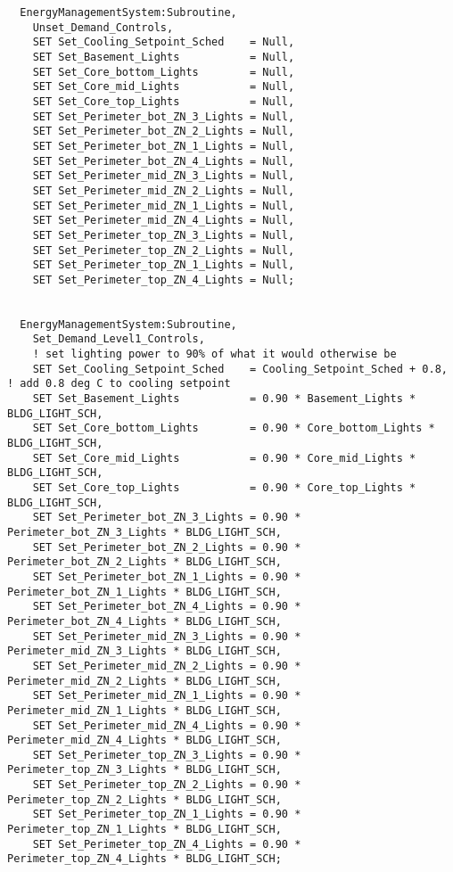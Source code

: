 \begin{lstlisting}
  EnergyManagementSystem:Subroutine,
    Unset_Demand_Controls,
    SET Set_Cooling_Setpoint_Sched    = Null,
    SET Set_Basement_Lights           = Null,
    SET Set_Core_bottom_Lights        = Null,
    SET Set_Core_mid_Lights           = Null,
    SET Set_Core_top_Lights           = Null,
    SET Set_Perimeter_bot_ZN_3_Lights = Null,
    SET Set_Perimeter_bot_ZN_2_Lights = Null,
    SET Set_Perimeter_bot_ZN_1_Lights = Null,
    SET Set_Perimeter_bot_ZN_4_Lights = Null,
    SET Set_Perimeter_mid_ZN_3_Lights = Null,
    SET Set_Perimeter_mid_ZN_2_Lights = Null,
    SET Set_Perimeter_mid_ZN_1_Lights = Null,
    SET Set_Perimeter_mid_ZN_4_Lights = Null,
    SET Set_Perimeter_top_ZN_3_Lights = Null,
    SET Set_Perimeter_top_ZN_2_Lights = Null,
    SET Set_Perimeter_top_ZN_1_Lights = Null,
    SET Set_Perimeter_top_ZN_4_Lights = Null;


  EnergyManagementSystem:Subroutine,
    Set_Demand_Level1_Controls,
    ! set lighting power to 90% of what it would otherwise be
    SET Set_Cooling_Setpoint_Sched    = Cooling_Setpoint_Sched + 0.8, ! add 0.8 deg C to cooling setpoint
    SET Set_Basement_Lights           = 0.90 * Basement_Lights * BLDG_LIGHT_SCH,
    SET Set_Core_bottom_Lights        = 0.90 * Core_bottom_Lights * BLDG_LIGHT_SCH,
    SET Set_Core_mid_Lights           = 0.90 * Core_mid_Lights * BLDG_LIGHT_SCH,
    SET Set_Core_top_Lights           = 0.90 * Core_top_Lights * BLDG_LIGHT_SCH,
    SET Set_Perimeter_bot_ZN_3_Lights = 0.90 * Perimeter_bot_ZN_3_Lights * BLDG_LIGHT_SCH,
    SET Set_Perimeter_bot_ZN_2_Lights = 0.90 * Perimeter_bot_ZN_2_Lights * BLDG_LIGHT_SCH,
    SET Set_Perimeter_bot_ZN_1_Lights = 0.90 * Perimeter_bot_ZN_1_Lights * BLDG_LIGHT_SCH,
    SET Set_Perimeter_bot_ZN_4_Lights = 0.90 * Perimeter_bot_ZN_4_Lights * BLDG_LIGHT_SCH,
    SET Set_Perimeter_mid_ZN_3_Lights = 0.90 * Perimeter_mid_ZN_3_Lights * BLDG_LIGHT_SCH,
    SET Set_Perimeter_mid_ZN_2_Lights = 0.90 * Perimeter_mid_ZN_2_Lights * BLDG_LIGHT_SCH,
    SET Set_Perimeter_mid_ZN_1_Lights = 0.90 * Perimeter_mid_ZN_1_Lights * BLDG_LIGHT_SCH,
    SET Set_Perimeter_mid_ZN_4_Lights = 0.90 * Perimeter_mid_ZN_4_Lights * BLDG_LIGHT_SCH,
    SET Set_Perimeter_top_ZN_3_Lights = 0.90 * Perimeter_top_ZN_3_Lights * BLDG_LIGHT_SCH,
    SET Set_Perimeter_top_ZN_2_Lights = 0.90 * Perimeter_top_ZN_2_Lights * BLDG_LIGHT_SCH,
    SET Set_Perimeter_top_ZN_1_Lights = 0.90 * Perimeter_top_ZN_1_Lights * BLDG_LIGHT_SCH,
    SET Set_Perimeter_top_ZN_4_Lights = 0.90 * Perimeter_top_ZN_4_Lights * BLDG_LIGHT_SCH;



\end{lstlisting}
